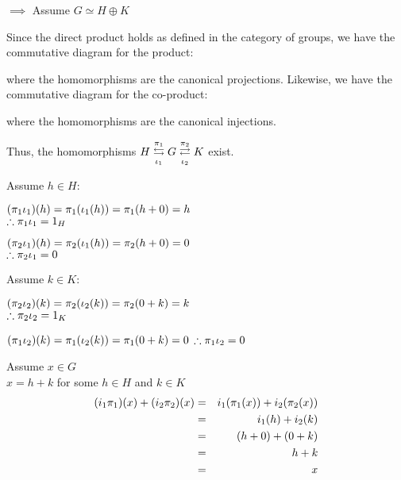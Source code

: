 \documentclass[letterpaper,12pt,fleqn]{article}
\begin{document}
\begin{description}
\item $\implies$ Assume $G\simeq H\oplus K$

  Since the direct product holds as defined in the category of groups, we
  have the commutative diagram for the product:


  where the homomorphisms are the canonical projections. Likewise, we have the
  commutative diagram for the co-product:


  where the homomorphisms are the canonical injections.

  Thus, the homomorphisms $H\overset{\pi_1}{\underset{\iota_1}\leftrightarrows}G\overset{\pi_2}{\underset{\iota_2}\rightleftarrows}K$ exist.
  
  Assume $h\in H$:

  $(\pi_1\iota_1)(h)=\pi_1(\iota_1(h))=\pi_1(h+0)=h$ \\
  $\therefore\pi_1\iota_1=1_H$

  $(\pi_2\iota_1)(h)=\pi_2(\iota_1(h))=\pi_2(h+0)=0$ \\
  $\therefore\pi_2\iota_1=0$

  Assume $k\in K$:
  
  $(\pi_2\iota_2)(k)=\pi_2(\iota_2(k))=\pi_2(0+k)=k$ \\
  $\therefore\pi_2\iota_2=1_K$
  
  $(\pi_1\iota_2)(k)=\pi_1(\iota_2(k))=\pi_1(0+k)=0$
  $\therefore\pi_1\iota_2=0$

  Assume $x\in G$ \\
  $x=h+k$ for some $h\in H$ and $k\in K$ \\
  \begin{eqnarray*}
    (i_1\pi_1)(x)+(i_2\pi_2)(x) &=& i_1(\pi_1(x))+i_2(\pi_2(x)) \\
    &=& i_1(h)+i_2(k) \\
    &=& (h+0)+(0+k) \\
    &=& h+k \\
    &=& x
  \end{eqnarray*}


\end{description}
\end{document}
